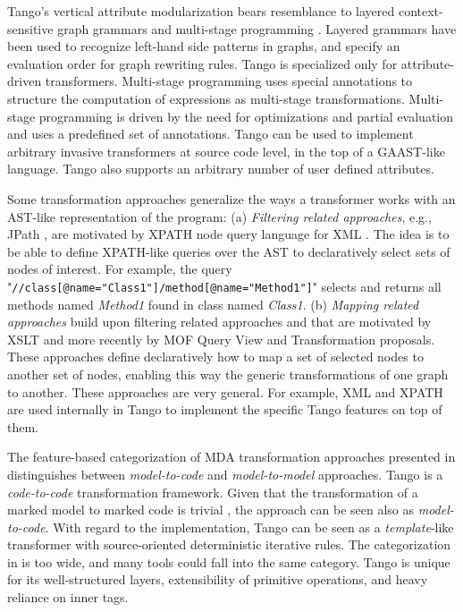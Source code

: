 Tango's vertical attribute modularization bears resemblance to layered context-sensitive graph grammars \cite{Rekers-Schuerr02:97} and multi-stage programming \cite{Taha.1997}. Layered grammars \cite{Rekers-Schuerr02:97} have been used to recognize left-hand side patterns in graphs, and specify an evaluation order for graph rewriting rules. Tango is specialized only for attribute-driven transformers. Multi-stage programming uses special annotations to structure the computation of expressions as multi-stage transformations. Multi-stage programming is driven by the need for optimizations and partial evaluation \cite{jonesetal.93} and uses a predefined set of annotations. Tango can be used to implement arbitrary invasive transformers \cite{java.compost} at source code level, in the top of a GAAST-like language. Tango also supports an arbitrary number of user defined attributes. 

Some transformation approaches generalize the ways a transformer works with an AST-like representation of the program: (a) \textit{Filtering related approaches}, e.g., JPath \cite{extract}, are motivated by XPATH \cite{url.xpath} node query language for XML \cite{skonnardetal.01}. The idea is to be able to define XPATH-like queries over the AST to declaratively select sets of nodes of interest. For example, the query  "\texttt{//class[@name=\-"Class1"]/\-method[@name=\-"Method1"]}" selects and returns all methods named \textit{Method1} found in class named \textit{Class1}. (b) \textit{Mapping related approaches} build upon filtering related approaches and that are motivated by XSLT \cite{xslt} and more recently by MOF Query View and Transformation \cite{mof-qvt-ibm-sub.03} proposals. These approaches define declaratively how to map a set of selected nodes to another set of nodes, enabling this way the generic transformations of one graph to another. These approaches are very general. For example, XML and XPATH are used internally in Tango to implement the specific Tango features on top of them.

The feature-based categorization of MDA transformation approaches presented in \cite{model-approach.03} distinguishes between \textit{model-to-code} and \textit{model-to-model} approaches. Tango is a \textit{code-to-code} transformation framework. Given that the transformation of a marked model to marked code is trivial , the approach can be seen also as \textit{model-to-code}. With regard to the implementation, Tango can be seen as a \textit{template}-like transformer with source-oriented deterministic iterative rules. The categorization in \cite{model-approach.03} is too wide, and many tools could fall into the same category. Tango is unique for its well-structured layers, extensibility of primitive operations, and heavy reliance on inner tags.

